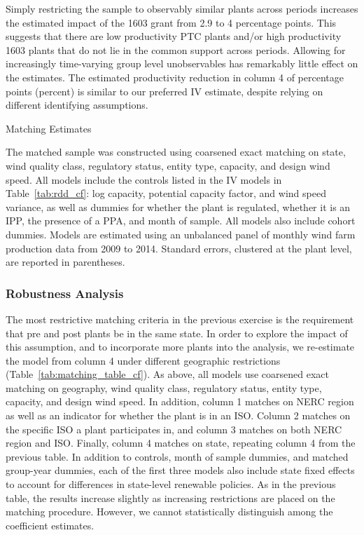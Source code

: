 \documentclass[12pt]{article}
\begin{document}
Simply restricting the sample to observably similar plants across periods increases the estimated impact of the 1603 grant from 2.9 to 4 percentage points. This suggests that there are low productivity PTC plants and/or high productivity 1603 plants that do not lie in the common support across periods. Allowing for increasingly time-varying group level unobservables has remarkably little effect on the estimates. The estimated productivity reduction in column 4 of percentage points (percent) is similar to our preferred IV estimate, despite relying on different identifying assumptions.

\begin{table}[h]
\begin{center}
\caption{Matching Estimates \label{tab:matching_group}}

\end{center}
\footnotesize
The matched sample was constructed using coarsened exact matching on state, wind quality class, regulatory status, entity type, capacity, and design wind speed. All models include the controls listed in the IV models in Table~\ref{tab:rdd_cf}: log capacity, potential capacity factor, and wind speed variance, as well as dummies for whether the plant is regulated, whether it is an IPP, the presence of a PPA, and month of sample. All models also include cohort dummies. Models are estimated using an unbalanced panel of monthly wind farm production data from 2009 to 2014. Standard errors, clustered at the plant level, are reported in parentheses.
\end{table}

\subsubsection*{Robustness Analysis}

The most restrictive matching criteria in the previous exercise is the requirement that pre and post plants be in the same state. In order to explore the impact of this assumption, and to incorporate more plants into the analysis, we re-estimate the model from column 4 under different geographic restrictions (Table~\ref{tab:matching_table_cf}). As above, all models use coarsened exact matching on geography, wind quality class, regulatory status, entity type, capacity, and design wind speed. In addition, column 1 matches on NERC region as well as an indicator for whether the plant is in an ISO. Column 2 matches on the specific ISO a plant participates in, and column 3 matches on both NERC region and ISO. Finally, column 4 matches on state, repeating column 4 from the previous table. In addition to controls, month of sample dummies, and matched group-year dummies, each of the first three models also include state fixed effects to account for differences in state-level renewable policies. As in the previous table, the results increase slightly as increasing restrictions are placed on the matching procedure. However, we cannot statistically distinguish among the coefficient estimates.
\end{document}
